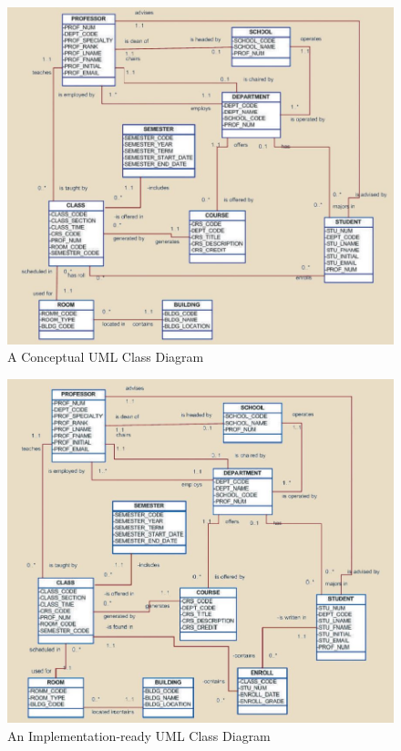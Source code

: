 \documentclass[a4paper, 12pt, titlepage]{report}
\begin{document}
{\begin{figure}[H]
\centering
\includegraphics[scale=0.7]{UML1}
\caption{A Conceptual UML Class Diagram}
\end{figure}
\begin{figure}[H]
\centering
\includegraphics[scale=0.7]{UML2}
\caption{An Implementation-ready UML Class Diagram}
\end{figure}

}
\end{document}
